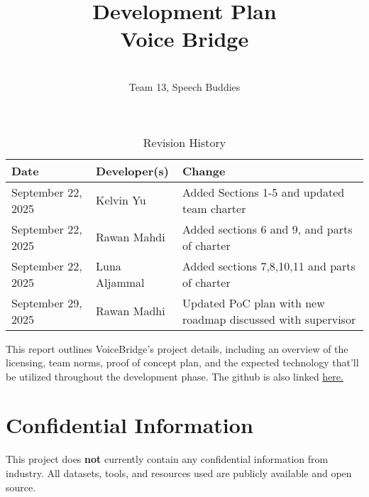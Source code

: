 \documentclass{article}
\title{Development Plan\\ Voice Bridge}
\author{\\ Team 13, Speech Buddies}
\date{}
\begin{document}
\maketitle

\begin{table}[hp]
\caption{Revision History} \label{TblRevisionHistory}
\begin{tabularx}{\textwidth}{llX}
\toprule
\textbf{Date} & \textbf{Developer(s)} & \textbf{Change}\\
\midrule
September 22, 2025 & Kelvin Yu & Added Sections 1-5 and updated team charter\\
September 22, 2025 & Rawan Mahdi & Added sections 6 and 9, and parts of charter \\
September 22, 2025 & Luna Aljammal & Added sections 7,8,10,11 and parts of charter \\
September 29, 2025 & Rawan Madhi & Updated PoC plan with new roadmap discussed with supervisor\\
\bottomrule
\end{tabularx}
\end{table}

\newpage{}

\begin{comment}\wss{Put your introductory blurb here.  Often the blurb is a brief roadmap of
what is contained in the report.}
\end{comment}

This report outlines VoiceBridge’s project details, including an overview of the licensing, team norms, proof of concept plan, and the expected technology that’ll be utilized throughout the development phase. 
The github is also linked \href{https://github.com/orgs/speech-buddies/projects/1}{here.} 

\begin{comment}\wss{Additional information on the development plan can be found in the
\href{https://gitlab.cas.mcmaster.ca/courses/capstone/-/blob/main/Lectures/L02b_POCAndDevPlan/POCAndDevPlan.pdf?ref_type=heads}
{lecture slides}.}
\end{comment}



\section{Confidential Information}

This project does \textbf{not} currently contain any confidential information from industry. All datasets, tools, and resources used are publicly available and open source.
\end{document}
